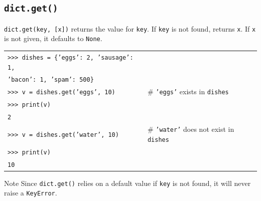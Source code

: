 \documentclass[t,handout,9pt]{beamer}
\begin{document}
\subsection{\texttt{dict.get()}}
\begin{frame}
\vfill
\texttt{dict.get(key, [x])} returns the value for \texttt{key}. If \texttt{key} is not found, returns \texttt{x}. If \texttt{x} is not given, it defaults to \texttt{None}.
\begin{table}[]
\begin{flushleft}
\begin{tabular}{ll}
\texttt{>{}>{}> dishes = \{'eggs': 2, 'sausage': 1,} &   \\
\texttt{\qquad 'bacon': 1, 'spam': 500\}} &   \\
\texttt{>{}>{}> v = dishes.get('eggs', 10)} &   \# \texttt{'eggs'} exists in \texttt{dishes} \\
\texttt{>{}>{}> print(v)} &   \\
\texttt{2} &   \\
\texttt{>{}>{}> v = dishes.get('water', 10)} &   \# \texttt{'water'} does not exist in \texttt{dishes} \\
\texttt{>{}>{}> print(v)} &   \\
\texttt{10} &   \\
\end{tabular}
\end{flushleft}
\end{table}
\begin{block}{Note}
Since \texttt{dict.get()} relies on a default value if \texttt{key} is not found, it will never raise a \texttt{KeyError}.
\end{block}
\vfill
\end{frame}
%
\end{document}
